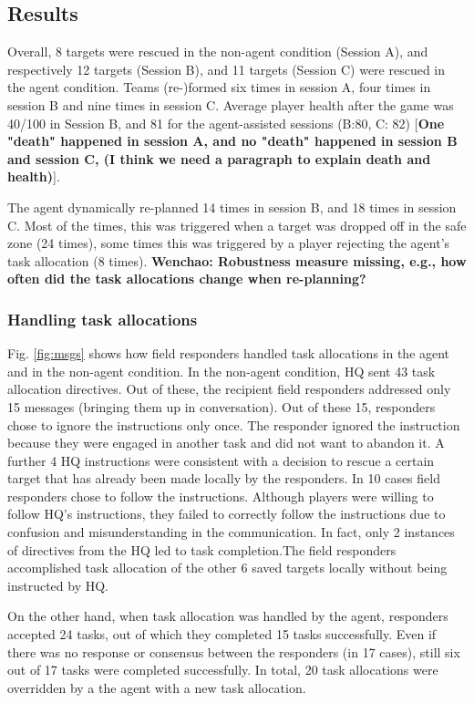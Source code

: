 \subsection{Results}
Overall, 8 targets were rescued in the non-agent condition (Session A), and respectively 12 targets (Session B), and 11 targets (Session C) were rescued in the agent condition. Teams (re-)formed six times in session A, four times in session B and nine times  in session C. Average player health after the game was 40/100 in Session B, and 81 for the agent-assisted sessions (B:80, C: 82) [\textbf{One "death" happened in session A, and no "death" happened in session B and session C, (I think we need a paragraph to explain death and health)}]. 

The agent dynamically re-planned 14 times in session B, and 18 times in session C. Most of the times, this was triggered when a target was dropped off in the safe zone (24 times), some times this was triggered by a player rejecting the agent's task allocation (8 times).  \textbf{Wenchao: Robustness measure missing, e.g., how often did the task allocations change when re-planning?}

\subsubsection{Handling task allocations}
Fig. \ref{fig:msgs} shows how field responders handled task allocations in the agent and in the non-agent condition. In the non-agent condition, HQ sent 43 task allocation directives. Out of these, the recipient field responders addressed only 15 messages (bringing them up in conversation). Out of these 15, responders chose to ignore the instructions only once. The responder ignored the instruction because they were engaged in another task and did not want to abandon it. A further 4 HQ instructions were consistent with a decision to rescue a certain target that has already been made locally by the responders. In 10 cases field responders chose to follow the instructions. Although players were willing to follow HQ's instructions, they failed to correctly follow the instructions due to confusion and misunderstanding in the communication. In fact, only 2 instances of directives from the HQ led to task completion.The field responders accomplished task allocation of the other 6 saved targets locally without being instructed by HQ.

On the other hand, when task allocation was handled by the agent, responders accepted 24 tasks, out of which they completed 15 tasks successfully. Even if there was no response or consensus between the responders (in 17 cases), still six out of 17 tasks were completed successfully. In total, 20 task allocations were overridden by a the agent with a new task allocation. 

